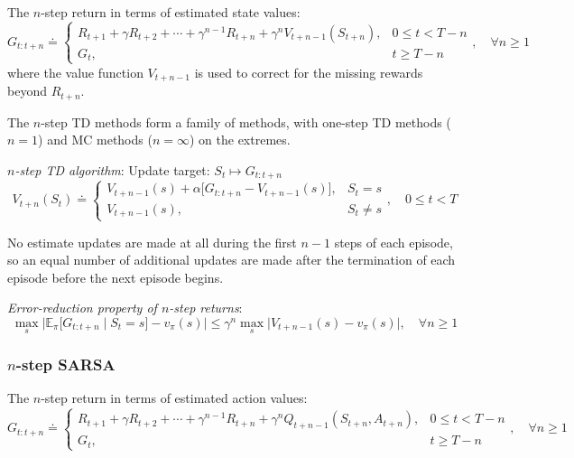 The \( n \)-step return in terms of estimated state values:
\begin{equation}
    G_{t:t+n}
    \doteq
    \begin{cases}
        R_{t+1} + \gamma R_{t+2} + \cdots + \gamma^{n-1} R_{t+n} + \gamma^n V_{t+n-1}(S_{t+n}),
         &
        0 \leq t < T - n
        \\
        G_t,
         &
        t \geq T - n
    \end{cases}
    , \quad \forall n \geq 1
\end{equation}
where the value function \( V_{t+n-1} \) is used to correct for the missing rewards beyond \( R_{t+n} \).

The \( n \)-step TD methods form a family of methods, with one-step TD methods (\( n = 1 \)) and MC methods (\( n = \infty \)) on the extremes.

\textit{\( n \)-step TD algorithm}:
Update target: \( S_t \mapsto G_{t:t+n} \)
\begin{equation}
    V_{t+n}(S_t)
    \doteq
    \begin{cases}
        V_{t+n-1}(s) + \alpha \Big[ G_{t:t+n} - V_{t+n-1}(s) \Big],
         &
        S_t = s
        \\
        V_{t+n-1}(s),
         &
        S_t \neq s
    \end{cases}
    , \quad 0 \leq t < T
\end{equation}

No estimate updates are made at all during the first \( n-1 \) steps of each episode, so an equal number of additional updates are made after the termination of each episode before the next episode begins.

\textit{Error-reduction property of \( n \)-step returns}:
\begin{equation}
    \max_{s} \Big| \mathbb{E}_{\pi} \big[ G_{t:t+n} \;\big|\; S_t = s \big] - v_\pi(s) \Big|
    \leq
    \gamma^n \max_{s} \Big| V_{t+n-1}(s) - v_\pi(s) \Big|
    , \quad \forall n \geq 1
\end{equation}

\subsubsection{\texorpdfstring{\( n \)}{ (n) }-step SARSA}

The \( n \)-step return in terms of estimated action values:
\begin{equation}
    G_{t:t+n}
    \doteq
    \begin{cases}
        R_{t+1} + \gamma R_{t+2} + \cdots + \gamma^{n-1} R_{t+n} + \gamma^n Q_{t+n-1}(S_{t+n}, A_{t+n}),
         &
        0 \leq t < T - n
        \\
        G_t,
         &
        t \geq T - n
    \end{cases}
    , \quad \forall n \geq 1
\end{equation}

